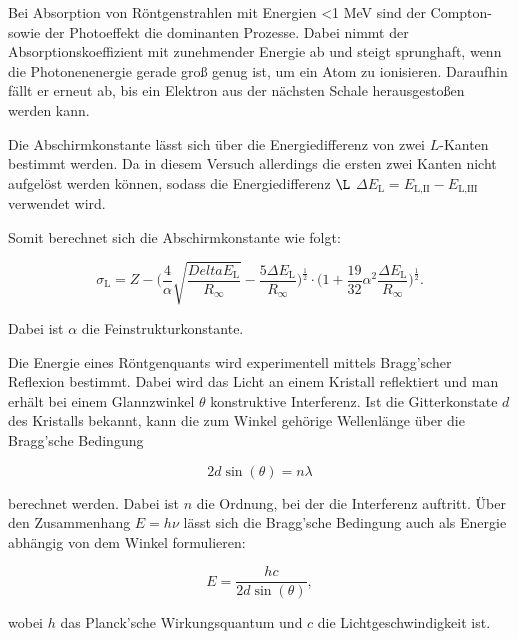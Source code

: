 Bei Absorption von Röntgenstrahlen mit Energien <1 MeV sind der Compton- sowie der Photoeffekt die dominanten Prozesse.
Dabei nimmt der Absorptionskoeffizient mit zunehmender Energie ab und steigt sprunghaft, wenn die Photonenenergie gerade groß genug ist, um ein Atom zu ionisieren.
Daraufhin fällt er erneut ab, bis ein Elektron aus der nächsten Schale herausgestoßen werden kann.

Die Abschirmkonstante lässt sich über die Energiedifferenz von zwei $L$-Kanten bestimmt werden. Da in diesem Versuch allerdings die ersten zwei Kanten nicht aufgelöst werden können, sodass die Energiedifferenz $\L$ $\Delta E_\text{L} = E_\text{L,II} - E_\text{L,III}$ verwendet wird.

Somit berechnet sich die Abschirmkonstante wie folgt:

\begin{equation}
    \label{eqn:abschirm}
    \sigma_\text{L} = Z - \bigg( \frac{4}{\alpha} \sqrt{\frac{Delta E_\text{L}}{R_\infty }} - \frac{5 \Delta E_\text{L}}{R_\infty} \bigg)^\frac{1}{2} \cdot \bigg( 1 + \frac{19}{32} \alpha^2 \frac{\Delta E_\text{L}}{R_\infty} \bigg)^\frac{1}{2}.
\end{equation}

Dabei ist $\alpha$ die Feinstrukturkonstante.

Die Energie eines Röntgenquants wird experimentell mittels Bragg'scher Reflexion bestimmt.
Dabei wird das Licht an einem Kristall reflektiert und man erhält bei einem Glannzwinkel $\theta$ konstruktive Interferenz.
Ist die Gitterkonstate $d$ des Kristalls bekannt, kann die zum Winkel gehörige Wellenlänge über die Bragg'sche Bedingung

\begin{equation}
    \label{eqn:bragg}
    2 d \sin (\theta) = n \lambda
\end{equation}

berechnet werden. Dabei ist $n$ die Ordnung, bei der die Interferenz auftritt.
Über den Zusammenhang $E = h \nu$ lässt sich die Bragg'sche Bedingung auch als Energie abhängig von dem Winkel formulieren:

\begin{equation}
    \label{eqn:bragg-energie}
    E = \frac{h c}{2 d \sin (\theta )},
\end{equation}

wobei $h$ das Planck'sche Wirkungsquantum und $c$ die Lichtgeschwindigkeit ist.